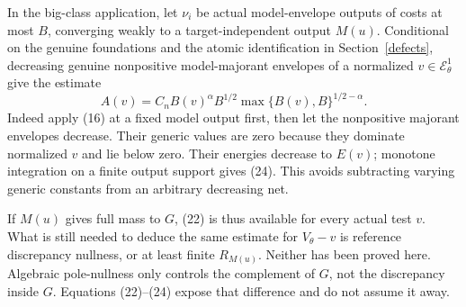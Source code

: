 \documentclass[10pt]{article}
\newcommand{\E}{\mathcal E}
\begin{document}
In the big-class application, let $\nu_i$ be actual model-envelope
outputs of costs at most $B$, converging weakly to a target-independent
output $M(u)$. Conditional on the genuine foundations and the atomic
identification in Section~\ref{defects}, decreasing genuine
nonpositive model-majorant envelopes of a normalized
$v\in\E^1_\theta$ give the estimate
\[
 A(v)=C_n B(v)^\alpha B^{1/2}
                   \max\{B(v),B\}^{1/2-\alpha}.             \tag{24}
\]
Indeed apply (16) at a fixed model output first, then let the
nonpositive majorant envelopes decrease. Their generic values are
zero because they dominate normalized $v$ and lie below zero.
Their energies decrease to $E(v)$; monotone integration on a finite
output support gives (24). This avoids subtracting varying generic
constants from an arbitrary decreasing net.

If $M(u)$ gives full mass to $G$, (22) is thus available for every
actual test $v$. What is still needed to deduce the same estimate for
$V_\theta-v$ is reference discrepancy nullness, or at least
finite $R_{M(u)}$. Neither has been proved here. Algebraic pole-nullness
only controls the complement of $G$, not the discrepancy inside $G$.
Equations (22)--(24) expose that difference and do not assume it away.
\end{document}
